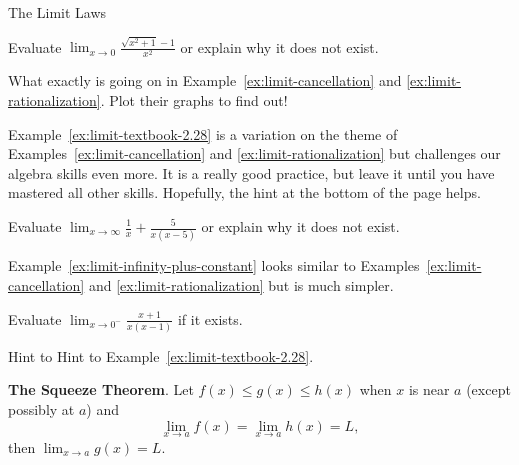\documentclass[../main.tex]{subfiles}
\begin{document}
\begin{lesson}{The Limit Laws}
  \begin{example} \label{ex:limit-rationalization}
    Evaluate \(\lim_{x \to 0} \frac{\sqrt{x^{2}+1}-1}{x^{2}}\) or explain why it does not exist.
  \end{example}

  \faComment{} What exactly is going on in Example~\ref{ex:limit-cancellation} and \ref{ex:limit-rationalization}. Plot their graphs to find out!
  \clearpage

  Example~\ref{ex:limit-textbook-2.28} is a variation on the theme of Examples~\ref{ex:limit-cancellation} and \ref{ex:limit-rationalization} but challenges our algebra skills even more. It is a really good practice, but leave it until you have mastered all other skills. Hopefully, the hint at the bottom of the page helps.
  \begin{example} \label{ex:limit-textbook-2.28}
    Evaluate \(\lim_{x \to \infty} \frac{1}{x} + \frac{5}{x(x-5)}\) or explain why it does not exist.
  \end{example}

  Example~\ref{ex:limit-infinity-plus-constant} looks similar to Examples~\ref{ex:limit-cancellation} and \ref{ex:limit-rationalization} but is much simpler.
  \begin{example} \label{ex:limit-infinity-plus-constant}
    Evaluate \(\lim_{x \to 0^{-}} \frac{x+1}{x(x-1)}\) if it exists.
  \end{example}

  \vfill{}
  {\scriptsize Hint to Hint to Example~\ref{ex:limit-textbook-2.28}}. \newline
  \clearpage

  \begin{mdframed}[style=withref]
    \textbf{The Squeeze Theorem}. Let {\(f(x) \le g(x) \le h(x)\)} when \(x\) is near \(a\) (except possibly at \(a\)) and
    \[ { \lim_{x \to a} f(x) = \lim_{x \to a} h(x) = L,} \]
    then
    {\(\lim_{x \to a} g(x) = L\).}


\end{mdframed}
\end{lesson}
\end{document}
